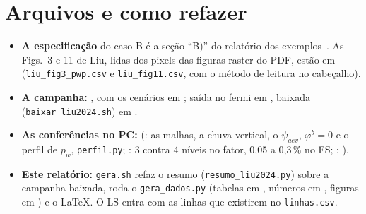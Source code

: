 \documentclass[11pt,a4paper]{article}
\begin{document}
\section{Arquivos e como refazer}
\begin{itemize}
  \item \textbf{A especificação} do caso B é a seção ``B)'' do relatório dos exemplos~\cite{exemplos}. As Figs.~3 e 11
    de Liu, lidas dos pixels das figuras raster do PDF, estão em  (\texttt{liu\_fig3\_pwp.csv} e
    \texttt{liu\_fig11.csv}, com o método de leitura no cabeçalho).
  \item \textbf{A campanha:} , com os cenários
    em ; saída no fermi em , baixada (\texttt{baixar\_liu2024.sh}) em
    .
  \item \textbf{As conferências no PC:}  (: as malhas, a chuva vertical, o
    $\psi_{aev}$, $\varphi^b = 0$ e o perfil de $p_w$, \texttt{perfil.py}; : 3 contra 4 níveis no fator,
    0,05 a 0,3\,\% no FS; ; ).
  \item \textbf{Este relatório:} \texttt{gera.sh} refaz o resumo (\texttt{resumo\_liu2024.py}) sobre a campanha baixada,
    roda o \texttt{gera\_dados.py} (tabelas em , números em , figuras em ) e
    o \LaTeX. O LS entra com as linhas que existirem no \texttt{linhas.csv}.
\end{itemize}
\end{document}

